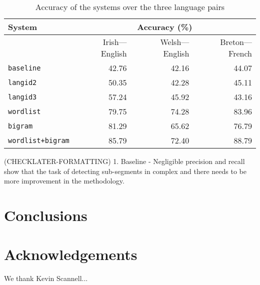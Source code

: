 \documentclass[11pt]{article}
\begin{document}
\begin{table}
\begin{center}
\begin{tabular}{|l|r|r|r|}
\hline
\textbf{System} &  \multicolumn{3}{c|}{\textbf{Accuracy} (\%)} \\
\hline
       &   Irish---English & Welsh---English & Breton---French \\ 
\hline
\texttt{baseline} & 42.76 & 42.16 & 44.07 \\
\hline
\texttt{langid2} & 50.35 & 42.28 & 45.11  \\
\hline
\texttt{langid3} & 57.24 & 45.92 & 43.16 \\
\hline
\texttt{wordlist} & 79.75 & 74.28 & 83.96 \\
\hline
\texttt{bigram} & 81.29 & 65.62 & 76.79 \\
\hline
\texttt{wordlist+bigram} & 85.79 & 72.40 & 88.79 \\
\hline
\end{tabular}
\end{center}
\label{table:accuracy}
\caption{Accuracy of the systems over the three language pairs}
\end{table}


(CHECKLATER-FORMATTING)
1. Baseline - Negligible precision and recall show that the task of detecting sub-segments in complex and there needs to be more improvement in the methodology. 


\section{Conclusions}


\section*{Acknowledgements}

We thank Kevin Scannell... 



\end{document}

